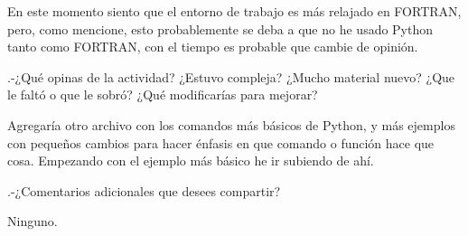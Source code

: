 \documentclass{article}
\begin{document}
    \vspace{0.3cm}
    En este momento siento que el entorno de trabajo es más relajado en FORTRAN, pero, como mencione, esto probablemente se deba a que no he usado Python tanto como FORTRAN, con el tiempo es probable que cambie de opinión.
    \vspace{0.3cm}
    
.-¿Qué opinas de la actividad? ¿Estuvo compleja? ¿Mucho material nuevo? ¿Que le faltó o que le sobró? ¿Qué modificarías para mejorar? 
    
    \vspace{0.3cm}
    Agregaría otro archivo con los comandos más básicos de Python, y más ejemplos con pequeños cambios para hacer énfasis en que comando o función hace que cosa. Empezando con el ejemplo más básico he ir subiendo de ahí.
    \vspace{0.3cm}
    
.-¿Comentarios adicionales que desees compartir?
    
    \vspace{0.3cm}
    Ninguno. 
    \vspace{0.3cm}
\end{document}

